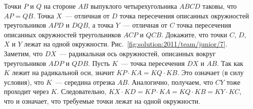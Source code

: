 \problem{}
Точки $P$ и $Q$ на стороне $AB$ выпуклого четырехугольника $ABCD$ таковы, что
$AP = QB$.
Точка $X$~--- отличная от $D$ точка пересечения описанных окружностей
треугольников $APD$ и $DQB$, а точка $Y$~--- отличная от $C$ точка пересечения
описанных окружностей треугольников $ACP$ и $QCB$.
Докажите, что точки $C$, $D$, $X$ и $Y$ лежат на одной окружности.
%
\label{solution:2011/team/junior/7}%
Рис.~\ref{fig:solution:2011/team/junior/7}.
Заметим, что $DX$~--- радикальная ось окружностей, описанных вокруг
треугольников $ADP$ и $QDB$.
Пусть $K$~--- точка пересечения $DX$ и $AB$.
Так как $K$ лежит на радикальной оси, значит $KP \cdot KA = KQ \cdot KB$.
Это означает (в силу условия), что $K$~--- середина отрезка $AB$.
Аналогично, получаем, что $CY$ тоже проходит через $K$.
Следовательно, $KX \cdot KD = KP \cdot KA = KQ \cdot KB = KY \cdot KC$, что и
означает, что требуемые точки лежат на одной окружности.
\endproblem
